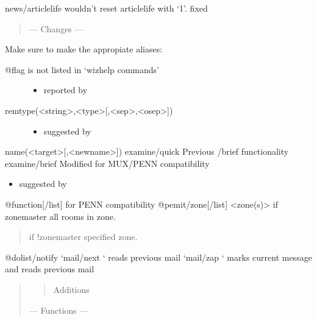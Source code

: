 \documentclass[letterpaper,10pt,english]{sphinxmanual}
\begin{document}
\sphinxAtStartPar
news/articlelife wouldn’t reset articlelife with ‘\sphinxhyphen{}1’.  \textendash{} fixed
\begin{quote}

\sphinxAtStartPar
—\sphinxhyphen{} Changes —\sphinxhyphen{}
\end{quote}

\sphinxAtStartPar
Make sure to make the appropiate aliases:
\begin{description}
\item[{@flag is not listed in ‘wizhelp commands’}] \leavevmode\begin{itemize}
\item {} 
\sphinxAtStartPar
reported by 

\end{itemize}

\item[{remtype(\textless{}string\textgreater{},\textless{}type\textgreater{}{[},\textless{}sep\textgreater{},\textless{}osep\textgreater{}{]})}] \leavevmode\begin{itemize}
\item {} 
\sphinxAtStartPar
suggested by 

\end{itemize}

\end{description}

\sphinxAtStartPar
name(\textless{}target\textgreater{}{[},\textless{}newname\textgreater{}{]})
examine/quick \sphinxhyphen{} Previous /brief functionality
examine/brief \sphinxhyphen{} Modified for MUX/PENN compatibility
\begin{itemize}
\item {} 
\sphinxAtStartPar
suggested by 

\end{itemize}

\sphinxAtStartPar
@function{[}/list{]} \sphinxhyphen{} for PENN compatibility
@pemit/zone{[}/list{]} \textless{}zone(s)\textgreater{} \sphinxhyphen{} if zonemaster \sphinxhyphen{} all rooms in zone.
\begin{quote}

\sphinxAtStartPar
if !zonemaster \sphinxhyphen{} specified zone.
\end{quote}

\sphinxAtStartPar
@dolist/notify
‘mail/next \sphinxhyphen{}‘ \sphinxhyphen{} reads previous mail
‘mail/zap \sphinxhyphen{}‘ \sphinxhyphen{} marks current message and reads previous mail
\begin{quote}
\begin{quote}

\sphinxAtStartPar
Additions
\end{quote}

\sphinxAtStartPar
— Functions —
\end{quote}
\end{document}
